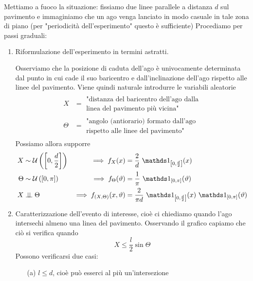 \Soluzione{}
Mettiamo a fuoco la situazione: fissiamo due linee parallele a distanza $d$ sul pavimento e immaginiamo che un ago venga lanciato in modo casuale in tale zona di piano (per "periodicità dell'esperimento" questo è sufficiente)
Procediamo per passi graduali:
\begin{enumerate}

\item Riformulazione dell'esperimento in termini astratti.

Osserviamo che la posizione di caduta dell'ago è univocamente determinata dal punto in cui cade il suo baricentro e dall'inclinazione dell'ago rispetto alle linee del pavimento. Viene quindi naturale introdurre le variabili aleatorie
\begin{gather*}
\begin{aligned}
X&=\begin{matrix}
\text{"distanza del baricentro dell'ago dalla} \\
\text{linea del pavimento più vicina"}
\end{matrix} \\
\Theta &=\begin{matrix}
\text{"angolo (antiorario) formato dall'ago} \\ 
\text{rispetto alle linee del pavimento"}
\end{matrix}
\end{aligned}
\end{gather*}
Possiamo allora supporre
\begin{align*}
X&\sim\Uc\left(\left[0,\frac{d}{2}\right]\right) &\implies f_X(x)&=\frac{2}{d}\ \Ind_{\left[0,\frac{d}{2}\right]}(x) \\
\Theta&\sim\Uc\left(\left[0,\pi\right]\right) &\implies f_\Theta(\vartheta)&=\frac{1}{\pi}\ \Ind_{\left[0,\pi\right]}(\vartheta) \\
X&\indep\Theta&\implies f_{(X,\Theta)}(x,\vartheta)&=\frac{2}{\pi d}\ \Ind_{\left[0,\frac{d}{2}\right]}(x)\ \Ind_{\left[0,\pi\right]}(\vartheta)
\end{align*}

\item Caratterizzazione dell'evento di interesse, cioè ci chiediamo quando l'ago intersechi almeno una linea del pavimento.
Osservando il grafico capiamo che ciò si verifica quando
\[
\boxed{X\leq\frac{l}{2}\sin\Theta}
\]
Possono verificarsi due casi:
\begin{enumerate}

\item [(a)] $l\leq d$, cioè può esserci al più un'intersezione


\end{enumerate}
\end{enumerate}
